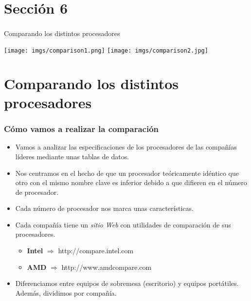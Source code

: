 \section*{Sección 6}
\frame
{
\frametitle{}
\begin{center}
\begin{huge}Comparando los distintos procesadores\newline\newline
\end{huge}
\texttt{[image: imgs/comparison1.png]}\hspace*{1cm}
\texttt{[image: imgs/comparison2.jpg]}
\end{center}
}

\section{Comparando los distintos procesadores}
\frame
{
\frametitle{Cómo vamos a realizar la comparación}
\begin{itemize}
 \item Vamos a analizar las especificaciones de los procesadores de las compañías líderes mediante unas tablas de datos.
 \item Nos centramos en el hecho de que un procesador teóricamente idéntico que otro con el mismo nombre clave es inferior debido a que difieren en el número de procesador.
 \item Cada número de procesador nos marca unas características.
 \item Cada compañía tiene un \textit{sitio Web} con utilidades de comparación de sus procesadores.
	\begin{itemize}
	\item \textbf{Intel} $\Rightarrow$ http://compare.intel.com
	\item \textbf{AMD} $\Rightarrow$ http://www.amdcompare.com
	\end{itemize}
 \item Diferenciamos entre equipos de sobremesa (escritorio) y equipos portátiles. Además, dividimos por compañía.
\end{itemize}
}

